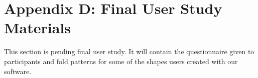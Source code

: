 \section{Appendix D: Final User Study
Materials}\label{appendix-d-final-user-study-materials}

This section is pending final user study. It will contain the
questionnaire given to participants and fold patterns for some of the
shapes users created with our software.
